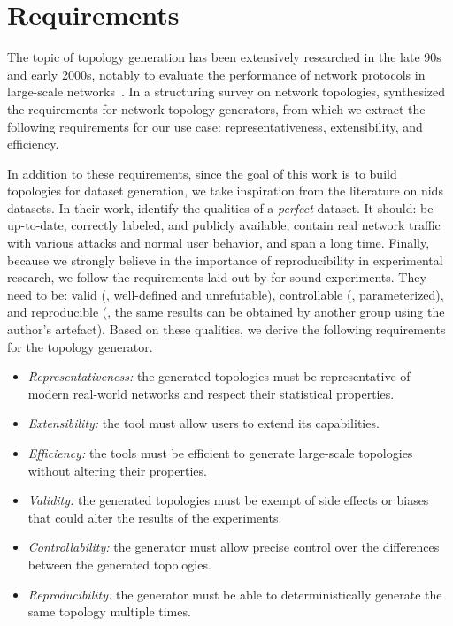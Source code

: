 \section{Requirements\label{sec:topologies.req}}

The topic of topology generation has been extensively researched in the late 90s and early 2000s, notably to evaluate the performance of network protocols in large-scale networks~\cite{medina_BRITEapproachuniversal_2001}.
In a structuring survey on network topologies, \textcite{haddadi_Networktopologiesinference_2008a} synthesized the requirements for network topology generators, from which we extract the following requirements for our use case: representativeness, extensibility, and efficiency.

In addition to these requirements, since the goal of this work is to build topologies for dataset generation, we take inspiration from the literature on \gls{nids} datasets.
In their work, \textcite{ring_surveynetworkbasedintrusion_2019} identify the qualities of a \emph{perfect} dataset.
It should: be up-to-date, correctly labeled, and publicly available, contain real network traffic with various attacks and normal user behavior, and span a long time.
Finally, because we strongly believe in the importance of reproducibility in experimental research, we follow the requirements laid out by \textcite{uetz_ReproducibleAdaptableLog_2021} for sound experiments.
They need to be: valid (\ie, well-defined and unrefutable), controllable (\eg, parameterized), and reproducible (\ie, the same results can be obtained by another group using the author's artefact).
Based on these qualities, we derive the following requirements for the topology generator.

\begin{itemize}
  \item \emph{Representativeness:} the generated topologies must be representative of modern real-world networks and respect their statistical properties.
  \item \emph{Extensibility:} the tool must allow users to extend its capabilities.
  \item \emph{Efficiency:} the tools must be efficient to generate large-scale topologies without altering their properties.
  \item \emph{Validity:} the generated topologies must be exempt of side effects or biases that could alter the results of the experiments.
  \item \emph{Controllability:} the generator must allow precise control over the differences between the generated topologies.
  \item \emph{Reproducibility:} the generator must be able to deterministically generate the same topology multiple times.
\end{itemize}


